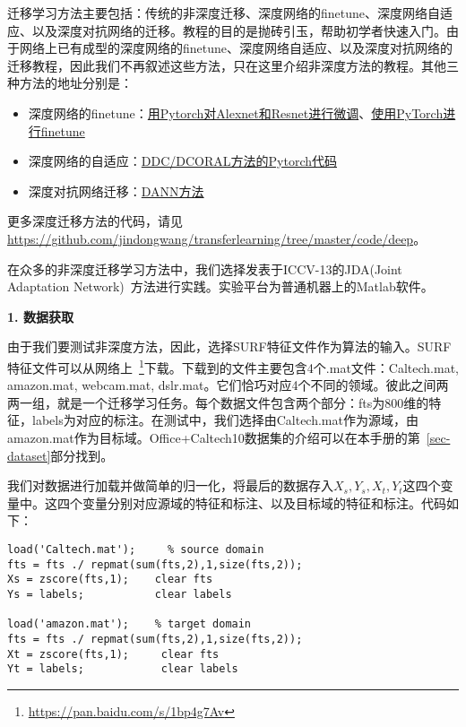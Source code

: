 迁移学习方法主要包括：传统的非深度迁移、深度网络的finetune、深度网络自适应、以及深度对抗网络的迁移。教程的目的是抛砖引玉，帮助初学者快速入门。由于网络上已有成型的深度网络的finetune、深度网络自适应、以及深度对抗网络的迁移教程，因此我们不再叙述这些方法，只在这里介绍非深度方法的教程。其他三种方法的地址分别是：

\begin{itemize}
	\item 深度网络的finetune：\href{https://github.com/jindongwang/transferlearning/tree/master/code/deep/finetune_AlexNet_ResNet}{用Pytorch对Alexnet和Resnet进行微调}、\href{https://pytorch.org/tutorials/beginner/transfer_learning_tutorial.html}{使用PyTorch进行finetune}
	\item 深度网络的自适应：\href{https://github.com/jindongwang/transferlearning/tree/master/code/deep/DDC_DeepCoral}{DDC/DCORAL方法的Pytorch代码}
	\item 深度对抗网络迁移：\href{https://github.com/jindongwang/transferlearning/tree/master/code/deep/DANN(RevGrad)}{DANN方法}
\end{itemize}

更多深度迁移方法的代码，请见\url{https://github.com/jindongwang/transferlearning/tree/master/code/deep}。


在众多的非深度迁移学习方法中，我们选择发表于ICCV-13的JDA(Joint Adaptation Network)~\cite{long2013transfer}方法进行实践。实验平台为普通机器上的Matlab软件。

\textbf{1. 数据获取}

由于我们要测试非深度方法，因此，选择SURF特征文件作为算法的输入。SURF特征文件可以从网络上~\footnote{\url{https://pan.baidu.com/s/1bp4g7Av}}下载。下载到的文件主要包含4个.mat文件：Caltech.mat, amazon.mat, webcam.mat, dslr.mat。它们恰巧对应4个不同的领域。彼此之间两两一组，就是一个迁移学习任务。每个数据文件包含两个部分：fts为800维的特征，labels为对应的标注。在测试中，我们选择由Caltech.mat作为源域，由amazon.mat作为目标域。Office+Caltech10数据集的介绍可以在本手册的第~\ref{sec-dataset}部分找到。

我们对数据进行加载并做简单的归一化，将最后的数据存入$X_s,Y_s,X_t,Y_t$这四个变量中。这四个变量分别对应源域的特征和标注、以及目标域的特征和标注。代码如下：

\begin{lstlisting}[title=Matlab加载数据, frame=shadowbox]
load('Caltech.mat');     % source domain
fts = fts ./ repmat(sum(fts,2),1,size(fts,2)); 
Xs = zscore(fts,1);    clear fts
Ys = labels;           clear labels

load('amazon.mat');    % target domain
fts = fts ./ repmat(sum(fts,2),1,size(fts,2)); 
Xt = zscore(fts,1);     clear fts
Yt = labels;            clear labels
\end{lstlisting}

